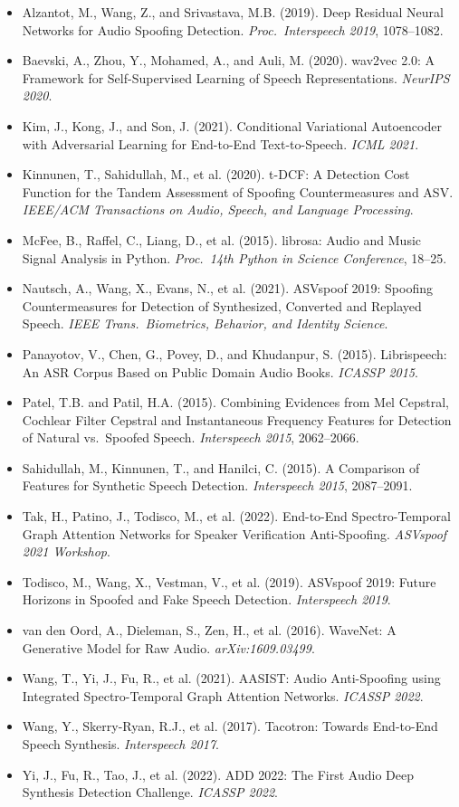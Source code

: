 \documentclass[12pt,a4paper]{report}
\begin{document}
\begin{itemize}[leftmargin=2em, itemsep=4pt]
  \item Alzantot, M., Wang, Z., and Srivastava, M.B. (2019). Deep Residual Neural Networks
    for Audio Spoofing Detection. \textit{Proc.\ Interspeech 2019}, 1078--1082.
  \item Baevski, A., Zhou, Y., Mohamed, A., and Auli, M. (2020). wav2vec 2.0: A Framework
    for Self-Supervised Learning of Speech Representations. \textit{NeurIPS 2020}.
  \item Kim, J., Kong, J., and Son, J. (2021). Conditional Variational Autoencoder with
    Adversarial Learning for End-to-End Text-to-Speech. \textit{ICML 2021}.
  \item Kinnunen, T., Sahidullah, M., et al. (2020). t-DCF: A Detection Cost Function for
    the Tandem Assessment of Spoofing Countermeasures and ASV.
    \textit{IEEE/ACM Transactions on Audio, Speech, and Language Processing}.
  \item McFee, B., Raffel, C., Liang, D., et al. (2015). librosa: Audio and Music Signal
    Analysis in Python. \textit{Proc.\ 14th Python in Science Conference}, 18--25.
  \item Nautsch, A., Wang, X., Evans, N., et al. (2021). ASVspoof 2019: Spoofing
    Countermeasures for Detection of Synthesized, Converted and Replayed Speech.
    \textit{IEEE Trans.\ Biometrics, Behavior, and Identity Science}.
  \item Panayotov, V., Chen, G., Povey, D., and Khudanpur, S. (2015). Librispeech: An ASR
    Corpus Based on Public Domain Audio Books. \textit{ICASSP 2015}.
  \item Patel, T.B. and Patil, H.A. (2015). Combining Evidences from Mel Cepstral, Cochlear
    Filter Cepstral and Instantaneous Frequency Features for Detection of Natural vs.\
    Spoofed Speech. \textit{Interspeech 2015}, 2062--2066.
  \item Sahidullah, M., Kinnunen, T., and Hanilci, C. (2015). A Comparison of Features for
    Synthetic Speech Detection. \textit{Interspeech 2015}, 2087--2091.
  \item Tak, H., Patino, J., Todisco, M., et al. (2022). End-to-End Spectro-Temporal Graph
    Attention Networks for Speaker Verification Anti-Spoofing.
    \textit{ASVspoof 2021 Workshop}.
  \item Todisco, M., Wang, X., Vestman, V., et al. (2019). ASVspoof 2019: Future Horizons
    in Spoofed and Fake Speech Detection. \textit{Interspeech 2019}.
  \item van den Oord, A., Dieleman, S., Zen, H., et al. (2016). WaveNet: A Generative
    Model for Raw Audio. \textit{arXiv:1609.03499}.
  \item Wang, T., Yi, J., Fu, R., et al. (2021). AASIST: Audio Anti-Spoofing using
    Integrated Spectro-Temporal Graph Attention Networks. \textit{ICASSP 2022}.
  \item Wang, Y., Skerry-Ryan, R.J., et al. (2017). Tacotron: Towards End-to-End Speech
    Synthesis. \textit{Interspeech 2017}.
  \item Yi, J., Fu, R., Tao, J., et al. (2022). ADD 2022: The First Audio Deep Synthesis
    Detection Challenge. \textit{ICASSP 2022}.
\end{itemize}
\end{document}
